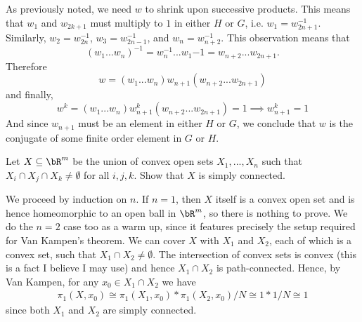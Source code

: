 \begin{homework}[e]
\begin{prf}
    As previously noted, we need $w$ to shrink upon successive products. This means that $w_1$ and $w_{2k+1}$ must multiply to $1$ in either $H$ or $G$, i.e. $w_1 = w_{2n+1}^{-1}$. Similarly, $w_2 = w_{2n}^{-1}$, $w_3 = w_{2n-1}^{-1}$, and $w_n = w_{n+2}^{-1}$. This observation means that 
    \begin{equation*}
        (w_1...w_n)^{-1} = w_n^{-1}...w_1{-1} = w_{n+2}...w_{2n+1}.
    \end{equation*}
    Therefore 
    \begin{equation*}
        w = (w_1...w_n)w_{n+1}(w_{n+2}...w_{2n+1})
    \end{equation*}
    and finally,
    \begin{equation*}
        w^k = (w_1...w_n)w_{n+1}^k(w_{n+2}...w_{2n+1}) = 1 
        \implies w_{n+1}^k = 1
    \end{equation*}
    And since $w_{n+1}$ must be an element in either $H$ or $G$, we conclude that $w$ is the conjugate of some finite order element in $G$ or $H$.


  \end{prf}
   Let $X \subseteq \bR^m$ be the union of convex open sets $X_1,...,X_n$ such that $X_i \cap X_j \cap X_k \neq \emptyset$ for all $i,j,k.$ Show that $X$ is simply connected. 
  \begin{prf}
    We proceed by induction on $n$. If $n = 1$, then $X$ itself is a convex open set and is hence homeomorphic to an open ball in $\bR^m$, so there is nothing to prove. We do the $n = 2$ case too as a warm up, since it features precisely the setup required for Van Kampen's theorem. We can cover $X$ with $X_1$ and $X_2$, each of which is a convex set, such that $X_1 \cap X_2 \neq \emptyset$. The intersection of convex sets is convex (this is a fact I believe I may use) and hence $X_1\cap X_2$ is path-connected. Hence, by Van Kampen, for any $x_0 \in X_1\cap X_2$ we have
    \begin{align*}
      \pi_1(X,x_0) \cong \pi_1(X_1,x_0) \ast \pi_1(X_2,x_0)/N \cong 1 \ast 1/N \cong 1
    \end{align*}
    since both $X_1$ and $X_2$ are simply connected.


\end{prf}
\end{homework}

